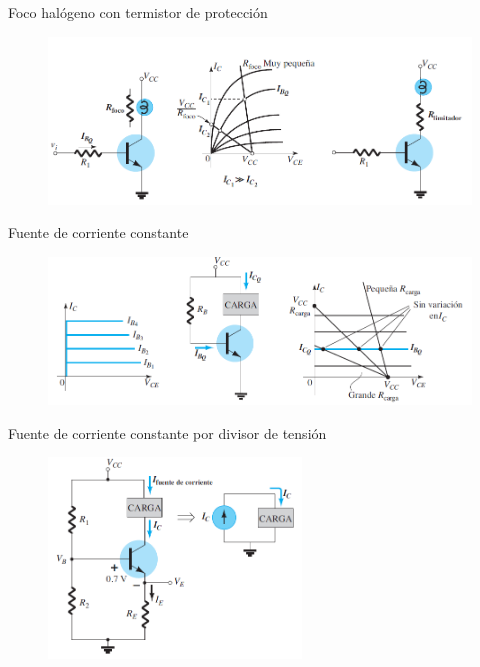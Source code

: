 \documentclass[t,aspectratio=169]{beamer}
\begin{document}
\begin{frame}{Foco halógeno con termistor de protección}

\begin{figure}[H]
    \centering
    \includegraphics[width=\textwidth]{figuras/aplicaciones_3_foco_termistor.png}
\end{figure}

\end{frame}


\begin{frame}{Fuente de corriente constante}

\begin{figure}[H]
    \centering
    \includegraphics[width=\textwidth]{figuras/aplicaciones_4_fuente_i_constante.png}
\end{figure}

\end{frame}


\begin{frame}{Fuente de corriente constante por divisor de tensión}

\begin{figure}[H]
    \centering
    \includegraphics[width=0.6\textwidth]{figuras/aplicaciones_5_fuente_i_constante.png}
\end{figure}

\end{frame}
\end{document}
